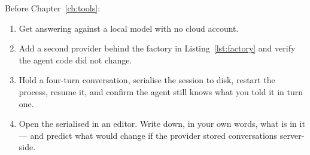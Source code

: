 \begin{exercisebox}
Before Chapter~\ref{ch:tools}:

\begin{enumerate}[leftmargin=1.4em]
\item Get  answering against a local model with no cloud account.
\item Add a second provider behind the factory in Listing~\ref{lst:factory} and
      verify the agent code did not change.
\item Hold a four-turn conversation, serialise the session to disk, restart the
      process, resume it, and confirm the agent still knows what you told it in
      turn one.
\item Open the serialised  in an editor. Write down, in your
      own words, what is in it --- and predict what would change if the provider
      stored conversations server-side.
\end{enumerate}
\end{exercisebox}
